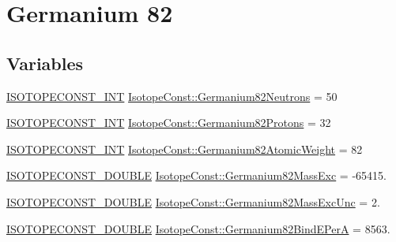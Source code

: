 \hypertarget{group___isotope_const-_germanium-_ge82}{}\section{Germanium 82}
\label{group___isotope_const-_germanium-_ge82}
\subsection*{Variables}
\begin{DoxyCompactItemize}
\item 
\mbox{\hyperlink{group___isotope_const-_macros_ga5f18360b3e99483a35c32d789e62621c}{I\+S\+O\+T\+O\+P\+E\+C\+O\+N\+S\+T\+\_\+\+I\+NT}} \mbox{\hyperlink{group___isotope_const-_germanium-_ge82_ga4dca4e139714558fc0c71114b3ff4063}{Isotope\+Const\+::\+Germanium82\+Neutrons}} = 50
\item 
\mbox{\hyperlink{group___isotope_const-_macros_ga5f18360b3e99483a35c32d789e62621c}{I\+S\+O\+T\+O\+P\+E\+C\+O\+N\+S\+T\+\_\+\+I\+NT}} \mbox{\hyperlink{group___isotope_const-_germanium-_ge82_ga2aa5450e11fab6019a1f611dcea4b741}{Isotope\+Const\+::\+Germanium82\+Protons}} = 32
\item 
\mbox{\hyperlink{group___isotope_const-_macros_ga5f18360b3e99483a35c32d789e62621c}{I\+S\+O\+T\+O\+P\+E\+C\+O\+N\+S\+T\+\_\+\+I\+NT}} \mbox{\hyperlink{group___isotope_const-_germanium-_ge82_ga2770f84bcf2969f56a60ce5164b0c5bf}{Isotope\+Const\+::\+Germanium82\+Atomic\+Weight}} = 82
\item 
\mbox{\hyperlink{group___isotope_const-_macros_ga8f45a7272ce02c0b4c65c44636ed719a}{I\+S\+O\+T\+O\+P\+E\+C\+O\+N\+S\+T\+\_\+\+D\+O\+U\+B\+LE}} \mbox{\hyperlink{group___isotope_const-_germanium-_ge82_gac16841cc905ba9cc4cfad70a1620436b}{Isotope\+Const\+::\+Germanium82\+Mass\+Exc}} = -\/65415.
\item 
\mbox{\hyperlink{group___isotope_const-_macros_ga8f45a7272ce02c0b4c65c44636ed719a}{I\+S\+O\+T\+O\+P\+E\+C\+O\+N\+S\+T\+\_\+\+D\+O\+U\+B\+LE}} \mbox{\hyperlink{group___isotope_const-_germanium-_ge82_ga096228b2d6779c81da5ed9b6ab389aaf}{Isotope\+Const\+::\+Germanium82\+Mass\+Exc\+Unc}} = 2.
\item 
\mbox{\hyperlink{group___isotope_const-_macros_ga8f45a7272ce02c0b4c65c44636ed719a}{I\+S\+O\+T\+O\+P\+E\+C\+O\+N\+S\+T\+\_\+\+D\+O\+U\+B\+LE}} \mbox{\hyperlink{group___isotope_const-_germanium-_ge82_ga09223be73864deee2853d82b0779705e}{Isotope\+Const\+::\+Germanium82\+Bind\+E\+PerA}} = 8563.
\item 

\end{DoxyCompactItemize}
